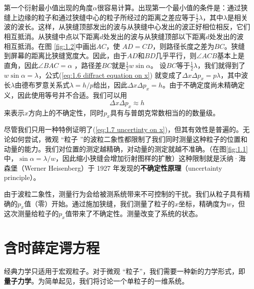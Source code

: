 	
	第一个衍射最小值出现的角度$\alpha$很容易计算。出现第一个最小值的条件是：通过狭缝上边缘的粒子和通过狭缝中心的粒子所经过的距离之差应等于$\frac{1}{2}\lambda$，其中$\lambda$是相关波的波长。这样，从狭缝顶部发出的波与从狭缝中心发出的波正好相位相反，它们相互抵消。从狭缝中点以下距离$d$处发出的波与从狭缝顶部以下距离$d$处发出的波相互抵消。在图 \ref{fig:1.2}中画出$AC$，使 $AD=CD$，则路径长度之差为$BC$。狭缝到屏幕的距离比狭缝宽度大。因此，由于$AD$和$BD$几乎平行，则$\angle ACB$基本上是直角，因此$\angle BAC = \alpha$ ，路径差$BC$就是$\frac{1}{2}w \sin \alpha$。 设$BC$等于$\frac{1}{2}\lambda$，我们就得到了$w\sin\alpha=\lambda$，公式(\ref{eq:1.6 diffract equation on x}) 就变成了$\Delta x \Delta p_x=p\lambda$，其中波长$\lambda$由德布罗意关系式$\lambda=h/p$给出，因此$\Delta x \Delta p_x=h$。由于不确定度尚未精确定义，因此使用等号并不合适。我们可以用 
	\begin{equation}
		\Delta x \Delta p_x \approx h
		\label{eq:1.7 uncertinty on x}
	\end{equation}
	来表示$x$方向上的不确定性，同时$p_x$具有与普朗克常数相当的的数量级。

	尽管我们只用一种特例证明了(\ref{eq:1.7 uncertinty on x})，但其有效性是普遍的。无论如何尝试，微观 “粒子 ”的波粒二象性都限制了我们同时测量这种粒子的位置和动量的能力。我们对位置的测定越精确，对动量的测定就越不准确。（在图\ref{fig:1.1}中，$\sin \alpha = \lambda / w$，因此缩小狭缝会增加衍射图样的扩散）这种限制就是沃纳·海森堡（Werner Heisenberg）于 1927 年发现的\textbf{不确定性原理}（uncertainty principle）。

	由于波粒二象性，测量行为会给被测系统带来不可控制的干扰。我们从粒子具有精确的$p_x$值（零）开始。通过施加狭缝，我们测量了粒子的$x$坐标，精确度为$w$，但这次测量给粒子的$p_x$值带来了不确定性。测量改变了系统的状态。
	
	
	\section{含时薛定谔方程}
	\label{sec:1.4 The Time-Dependent Schrödinger Equation}
	经典力学只适用于宏观粒子。对于微观 “粒子”，我们需要一种新的力学形式，即\textbf{量子力学}。为简单起见，我们将讨论一个单粒子的一维系统。

